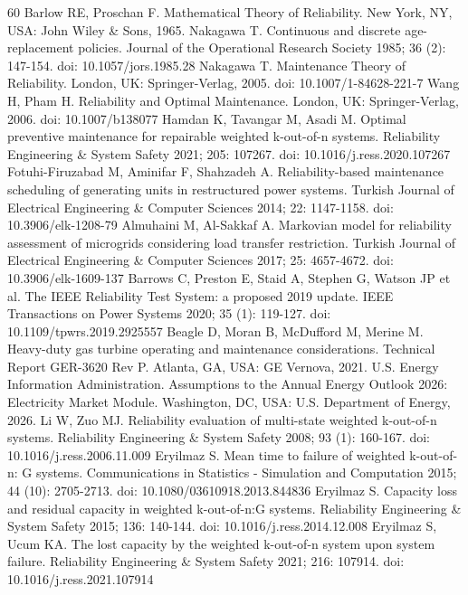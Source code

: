 \documentclass{elektr}
\begin{document}
\begin{thebibliography}{60}
 Barlow RE, Proschan F. Mathematical Theory of Reliability. New York, NY, USA: John Wiley \& Sons, 1965.
 Nakagawa T. Continuous and discrete age-replacement policies. Journal of the Operational Research Society 1985; 36 (2): 147-154. doi: 10.1057/jors.1985.28
 Nakagawa T. Maintenance Theory of Reliability. London, UK: Springer-Verlag, 2005. doi: 10.1007/1-84628-221-7
 Wang H, Pham H. Reliability and Optimal Maintenance. London, UK: Springer-Verlag, 2006. doi: 10.1007/b138077
 Hamdan K, Tavangar M, Asadi M. Optimal preventive maintenance for repairable weighted k-out-of-n systems. Reliability Engineering \& System Safety 2021; 205: 107267. doi: 10.1016/j.ress.2020.107267
 Fotuhi-Firuzabad M, Aminifar F, Shahzadeh A. Reliability-based maintenance scheduling of generating units in restructured power systems. Turkish Journal of Electrical Engineering \& Computer Sciences 2014; 22: 1147-1158. doi: 10.3906/elk-1208-79
 Almuhaini M, Al-Sakkaf A. Markovian model for reliability assessment of microgrids considering load transfer restriction. Turkish Journal of Electrical Engineering \& Computer Sciences 2017; 25: 4657-4672. doi: 10.3906/elk-1609-137
 Barrows C, Preston E, Staid A, Stephen G, Watson JP et al. The IEEE Reliability Test System: a proposed 2019 update. IEEE Transactions on Power Systems 2020; 35 (1): 119-127. doi: 10.1109/tpwrs.2019.2925557
 Beagle D, Moran B, McDufford M, Merine M. Heavy-duty gas turbine operating and maintenance considerations. Technical Report GER-3620 Rev P. Atlanta, GA, USA: GE Vernova, 2021.
 U.S. Energy Information Administration. Assumptions to the Annual Energy Outlook 2026: Electricity Market Module. Washington, DC, USA: U.S. Department of Energy, 2026.
 Li W, Zuo MJ. Reliability evaluation of multi-state weighted k-out-of-n systems. Reliability Engineering \& System Safety 2008; 93 (1): 160-167. doi: 10.1016/j.ress.2006.11.009
 Eryilmaz S. Mean time to failure of weighted k-out-of-n: G systems. Communications in Statistics - Simulation and Computation 2015; 44 (10): 2705-2713. doi: 10.1080/03610918.2013.844836
 Eryilmaz S. Capacity loss and residual capacity in weighted k-out-of-n:G systems. Reliability Engineering \& System Safety 2015; 136: 140-144. doi: 10.1016/j.ress.2014.12.008
 Eryilmaz S, Ucum KA. The lost capacity by the weighted k-out-of-n system upon system failure. Reliability Engineering \& System Safety 2021; 216: 107914. doi: 10.1016/j.ress.2021.107914

\end{thebibliography}
\end{document}
